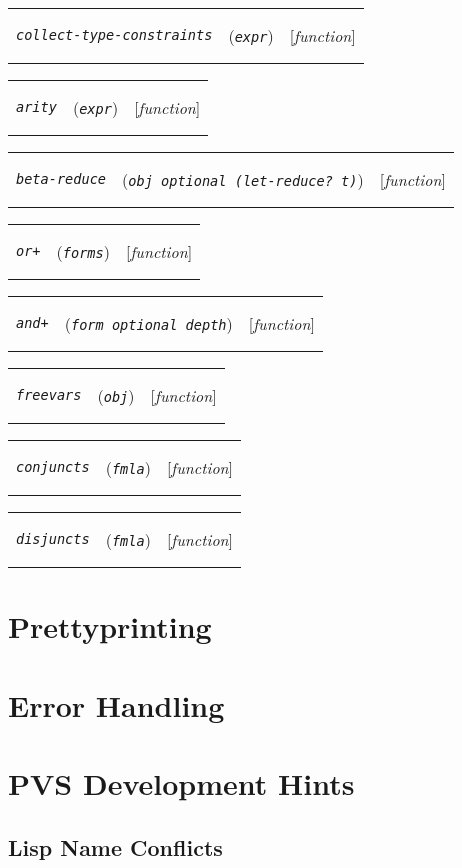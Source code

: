 \documentclass[12pt]{book}
\makeatletter
\def\ampoptional{{\smaller\sc {\smaller\smaller \&}optional\ }}
\newenvironment{function}[3]%
{\par\noindent\begin{boxedminipage}{\textwidth}%
 \par\noindent\begin{tabularx}{\linewidth}{l>{\raggedright}Xr}%
 \functionhtgt{#1}&(\texttt{\textit{#2}})&[\emph{#3}]%
 \end{tabularx}\par\flushright\begin{minipage}{.97\textwidth}}
{\end{minipage}\end{boxedminipage}}
\newcommand{\functionnm}[1]{\texttt{\textit{#1}}}
\newcommand{\functionhtgt}[1]{\hypertarget{#1}{\functionnm{#1}}\index{#1@\functionnm{#1}|underline}}
\newenvironment{lispfunction}[2]%
{\begin{function}{#1}{#2}{function}}{\end{function}}
\makeatother
\begin{document}
\begin{lispfunction}{collect-type-constraints}{expr}
\end{lispfunction}

\begin{lispfunction}{arity}{expr}
\end{lispfunction}

\begin{lispfunction}{beta-reduce}{obj \ampoptional \textup{(}let-reduce? \textup{t}\textup{)}}
\end{lispfunction}

\begin{lispfunction}{or+}{forms}
\end{lispfunction}

\begin{lispfunction}{and+}{form \ampoptional depth}
\end{lispfunction}

\begin{lispfunction}{freevars}{obj}
\end{lispfunction}

\begin{lispfunction}{conjuncts}{fmla}
\end{lispfunction}

\begin{lispfunction}{disjuncts}{fmla}
\end{lispfunction}


\section{Prettyprinting}

\section{Error Handling}
\label{error-handling}

\section{PVS Development Hints}

\subsection{Lisp Name Conflicts}
\end{document}
